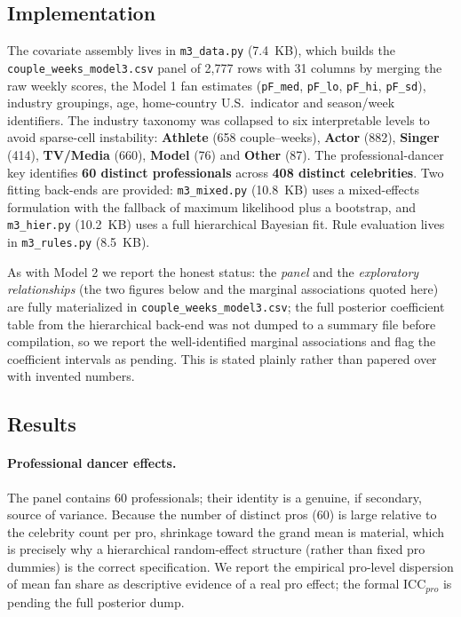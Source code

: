 \documentclass{article}
\begin{document}
\subsection{Implementation}

The covariate assembly lives in \texttt{m3\_data.py} (7.4~KB), which builds the
\texttt{couple\_weeks\_model3.csv} panel of 2{,}777 rows with 31 columns by merging the raw
weekly scores, the Model 1 fan estimates (\texttt{pF\_med}, \texttt{pF\_lo},
\texttt{pF\_hi}, \texttt{pF\_sd}), industry groupings, age, home-country U.S.\ indicator and
season/week identifiers. The industry taxonomy was collapsed to six interpretable levels to
avoid sparse-cell instability: \textbf{Athlete} (658 couple--weeks), \textbf{Actor} (882),
\textbf{Singer} (414), \textbf{TV/Media} (660), \textbf{Model} (76) and \textbf{Other}
(87). The professional-dancer key identifies \textbf{60 distinct professionals} across
\textbf{408 distinct celebrities}. Two fitting back-ends are provided:
\texttt{m3\_mixed.py} (10.8~KB) uses a mixed-effects formulation with the fallback of
maximum likelihood plus a bootstrap, and \texttt{m3\_hier.py} (10.2~KB) uses a full
hierarchical Bayesian fit. Rule evaluation lives in \texttt{m3\_rules.py} (8.5~KB).

As with Model 2 we report the honest status: the \emph{panel} and the \emph{exploratory
relationships} (the two figures below and the marginal associations quoted here) are fully
materialized in \texttt{couple\_weeks\_model3.csv}; the full posterior coefficient table
from the hierarchical back-end was not dumped to a summary file before compilation, so we
report the well-identified marginal associations and flag the coefficient intervals as
pending. This is stated plainly rather than papered over with invented numbers.

\subsection{Results}

\paragraph{Professional dancer effects.} The panel contains 60 professionals; their identity
is a genuine, if secondary, source of variance. Because the number of distinct pros (60) is
large relative to the celebrity count per pro, shrinkage toward the grand mean is material,
which is precisely why a hierarchical random-effect structure (rather than fixed pro
dummies) is the correct specification. We report the empirical pro-level dispersion of mean
fan share as descriptive evidence of a real pro effect; the formal $\mathrm{ICC}_{pro}$ is
pending the full posterior dump.
\end{document}
